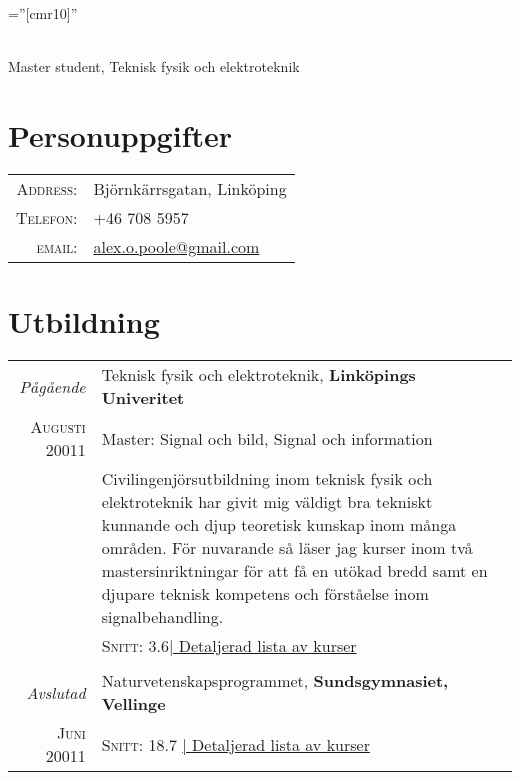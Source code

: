 \documentclass[a4paper,10pt]{article}
\begin{document}

\pagestyle{empty} %

\font\fb=''[cmr10]'' %

\par{ \\ Master student, Teknisk fysik och elektroteknik
    \bigskip\par}

\section{Personuppgifter}

\begin{tabular}{rl}
    \textsc{Address:}   & Björnkärrsgatan, Linköping \\
    \textsc{Telefon:}     & +46 708 5957\\
    \textsc{email:}     & \href{mailto:alex.o.poole@gmail.com}{alex.o.poole@gmail.com}
\end{tabular}

\section{Utbildning}
\begin{tabular}{r|p{11cm}}	


 \emph{Pågående} & Teknisk fysik och elektroteknik, \textbf{Linköpings Univeritet}\\
\textsc{Augusti} 20011 &  Master: Signal och bild, Signal och information\\
& \footnotesize{Civilingenjörsutbildning inom teknisk fysik och elektroteknik har givit mig väldigt bra tekniskt kunnande och djup teoretisk kunskap inom många områden. För nuvarande så läser jag kurser inom två mastersinriktningar för att få en utökad bredd samt en djupare teknisk kompetens och förståelse inom signalbehandling.}\\
&\normalsize \textsc{Snitt}: 3.6\hyperlink{grds_cleli}{\hfill| \footnotesize Detaljerad lista av kurser}
\\\multicolumn{2}{c}{} \\

\emph{Avslutad} & Naturvetenskapsprogrammet, \textbf{Sundsgymnasiet, Vellinge}\\
\textsc{Juni} 20011 & \normalsize \textsc{Snitt}: 18.7 \hyperlink{grds_cleli}{\hfill| \footnotesize Detaljerad lista av kurser}
\\

\end{tabular}
\end{document}
